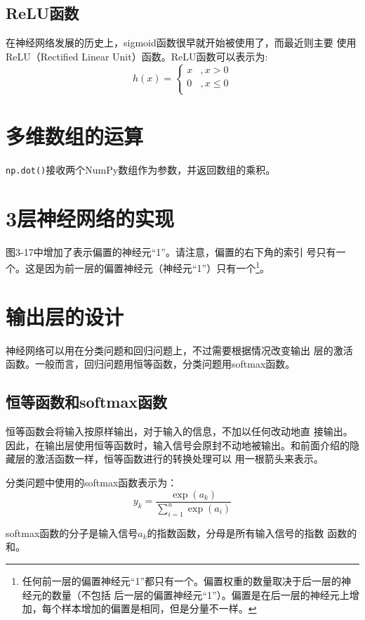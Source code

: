 \subsection{ReLU函数}
在神经网络发展的历史上，sigmoid函数很早就开始被使用了，而最近则主要
使用ReLU（Rectified Linear Unit）函数。ReLU函数可以表示为:
\begin{equation}
    h(x)=\left\{
    \begin{array}{ll}
        x & , x>0     \\
        0 & , x\leq 0 \\
    \end{array}
    \right.
\end{equation}
\section{多维数组的运算}
\verb|np.dot()|接收两个NumPy数组作为参数，并返回数组的乘积。

\section{3层神经网络的实现}
图3-17中增加了表示偏置的神经元“1”。请注意，偏置的右下角的索引
号只有一个。这是因为前一层的偏置神经元（神经元“1”）只有一个\footnote{任何前一层的偏置神经元“1”都只有一个。偏置权重的数量取决于后一层的神经元的数量（不包括
    后一层的偏置神经元“1”）。偏置是在后一层的神经元上增加，每个样本增加的偏置是相同，但是分量不一样。}。
\section{输出层的设计}
神经网络可以用在分类问题和回归问题上，不过需要根据情况改变输出
层的激活函数。一般而言，回归问题用恒等函数，分类问题用softmax函数。
\subsection{恒等函数和softmax函数}
恒等函数会将输入按原样输出，对于输入的信息，不加以任何改动地直
接输出。因此，在输出层使用恒等函数时，输入信号会原封不动地被输出。和前面介绍的隐藏层的激活函数一样，恒等函数进行的转换处理可以
用一根箭头来表示。

分类问题中使用的softmax函数表示为：
\begin{equation}
    \label{eq3-10}
    y_k=\frac{\exp(a_k)}{\sum\limits_{i=1}^n{\exp(a_i)}}
\end{equation}

softmax函数的分子是输入信号$a_k$的指数函数，分母是所有输入信号的指数
函数的和。

